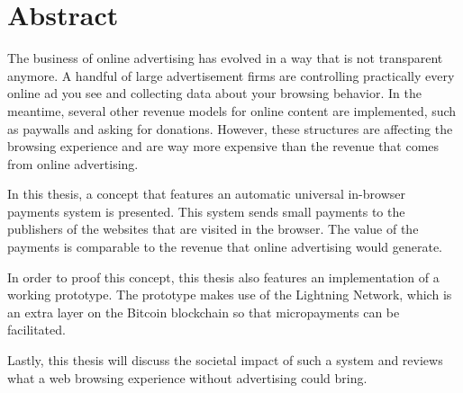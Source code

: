 \chapter*{Abstract}
\label{cha:abstract}
The business of online advertising has evolved in a way that is not transparent anymore. A handful of large advertisement firms are controlling practically every online ad you see and collecting data about your browsing behavior. In the meantime, several other revenue models for online content are implemented, such as paywalls and asking for donations. However, these structures are affecting the browsing experience and are way more expensive than the revenue that comes from online advertising. 

In this thesis, a concept that features an automatic universal in-browser payments system is presented. This system sends small payments to the publishers of the websites that are visited in the browser. The value of the payments is comparable to the revenue that online advertising would generate.

In order to proof this concept, this thesis also features an implementation of a working prototype. The prototype makes use of the Lightning Network, which is an extra layer on the Bitcoin blockchain so that micropayments can be facilitated.

Lastly, this thesis will discuss the societal impact of such a system and reviews what a web browsing experience without advertising could bring. 